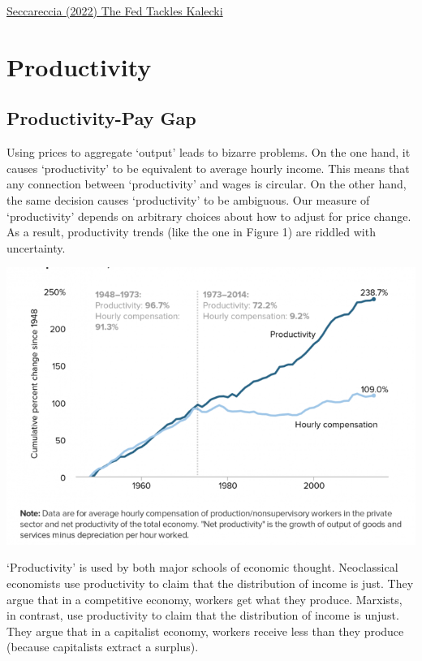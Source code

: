 \documentclass[
]{book}
\begin{document}
\href{https://www.ineteconomics.org/perspectives/blog/the-fed-tackles-kalecki}{Seccareccia (2022) The Fed Tackles Kalecki}

\hypertarget{productivity}{%
\chapter{Productivity}\label{productivity}}

\hypertarget{productivity-pay-gap}{%
\section{Productivity-Pay Gap}\label{productivity-pay-gap}}

Using prices to aggregate `output' leads to bizarre problems. On the one hand, it causes `productivity' to be equivalent to average hourly income. This means that any connection between `productivity' and wages is circular. On the other hand, the same decision causes `productivity' to be ambiguous. Our measure of `productivity' depends on arbitrary choices about how to adjust for price change. As a result, productivity trends (like the one in Figure 1) are riddled with uncertainty.

\includegraphics{fig/productivity_pay_gap.png}

`Productivity' is used by both major schools of economic thought. Neoclassical economists use productivity to claim that the distribution of income is just. They argue that in a competitive economy, workers get what they produce. Marxists, in contrast, use productivity to claim that the distribution of income is unjust. They argue that in a capitalist economy, workers receive less than they produce (because capitalists extract a surplus).
\end{document}
